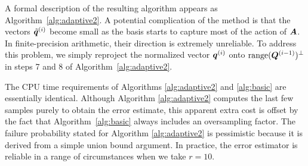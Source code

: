 \documentclass[final]{siamltex}
\newcounter{algorithm}[section]
\begin{document}
A formal description of the resulting algorithm appears as Algorithm~\ref{alg:adaptive2}.
A potential complication of the method is that the vectors $\tilde{\bm{q}}^{(i)}$ become
small as the basis starts to capture most of the action of $\bm{A}$.
In finite-precision arithmetic, their direction is extremely
unreliable.  To address this problem, we simply reproject
the normalized vector $\bm{q}^{(i)}$ onto $\operatorname{range}(\bm{Q}^{(i-1)})^{\perp}$
in steps 7 and 8 of Algorithm~\ref{alg:adaptive2}.

The CPU time requirements of Algorithms \ref{alg:adaptive2} and \ref{alg:basic}
are essentially identical.
Although Algorithm \ref{alg:adaptive2} computes the last few samples purely to obtain
the error estimate, this apparent extra cost is offset by the fact that
Algorithm~\ref{alg:basic} always includes an oversampling factor.
The failure probability stated for Algorithm \ref{alg:adaptive2} is pessimistic because it
is derived from a simple union bound argument.  In practice,
the error estimator is reliable in a range of circumstances when we take $r = 10$.
\end{document}
